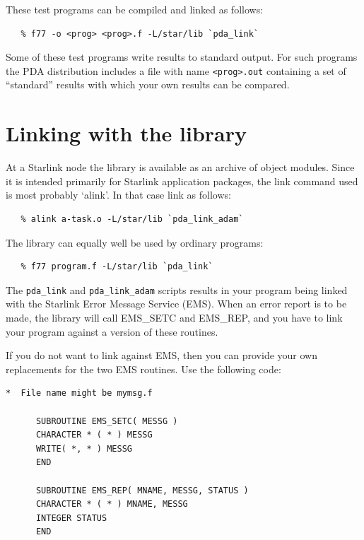 \documentclass[11pt,twoside]{article}
\newcommand{\xref}[3]{#1}
\begin{document}
These test programs can be compiled and linked as follows:

\begin{verbatim}
   % f77 -o <prog> <prog>.f -L/star/lib `pda_link`
\end{verbatim}

Some of these test programs write results to standard output. For such
programs the PDA distribution includes a file with name \verb+<prog>.out+
containing a set of ``standard'' results with which your own results can
be compared.


\section{\label{LINKING}Linking with the library}

   At a Starlink node the library is available as an archive of object
   modules. Since it is intended
   primarily for Starlink application packages, the link command used is
   most probably `alink'. In that case link as follows:

\begin{verbatim}
   % alink a-task.o -L/star/lib `pda_link_adam`
\end{verbatim}

   The library can equally well be used by ordinary programs:

\begin{verbatim}
   % f77 program.f -L/star/lib `pda_link`
\end{verbatim}

   The {\tt pda\_link} and {\tt pda\_link\_adam} scripts results in your
   program being linked with the Starlink Error Message Service
\xref{(EMS).}{ssn4}{}
   When an error report is to
   be made, the library will call EMS\_SETC and EMS\_REP, and you have to
   link your program against a version of these routines.

   If you do not want to link against EMS, then you can provide your own
   replacements for the two EMS routines. Use the following code:

\begin{verbatim}
*  File name might be mymsg.f

      SUBROUTINE EMS_SETC( MESSG )
      CHARACTER * ( * ) MESSG
      WRITE( *, * ) MESSG
      END

      SUBROUTINE EMS_REP( MNAME, MESSG, STATUS )
      CHARACTER * ( * ) MNAME, MESSG
      INTEGER STATUS
      END
\end{verbatim}
\end{document}
